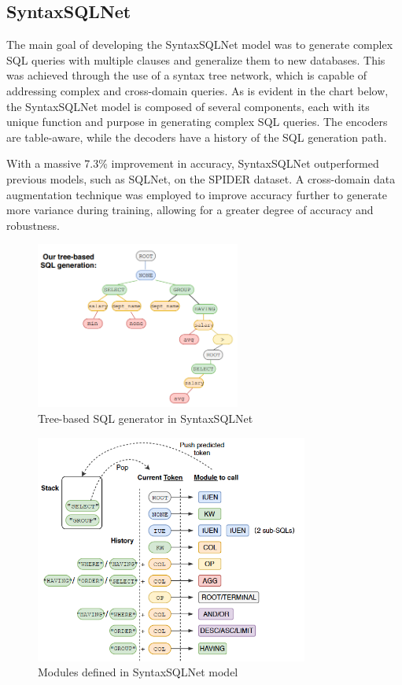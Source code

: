 \subsection{SyntaxSQLNet}

The main\cite{DBLP:journals/corr/abs-1810-05237} goal of developing the SyntaxSQLNet model was to generate complex SQL queries with multiple clauses and generalize them to new databases.
This was achieved through the use of a syntax tree network, which is capable of addressing complex and cross-domain queries.
As is evident in the chart below, the SyntaxSQLNet model is composed of several components, each with its unique function and purpose in generating complex SQL queries. The encoders are table-aware, while the decoders have a history of the SQL generation path.

With a massive 7.3\% improvement in accuracy, SyntaxSQLNet outperformed previous models, such as SQLNet, on the SPIDER dataset.
A cross-domain data augmentation technique was employed to improve accuracy further to generate more variance during training, allowing for a greater degree of accuracy and robustness.

\begin{figure}[htb]
    \centering
    \includegraphics[width=0.6\textwidth]{pics/SyntaxSQLNet/Tree-based.png}
    \caption{Tree-based SQL generator in SyntaxSQLNet\cite{DBLP:journals/corr/abs-1810-05237}}
    \label{fig:tree-based}
\end{figure}

\begin{figure}[htb]
    \centering
    \includegraphics[width=0.8\textwidth]{pics/SyntaxSQLNet/Grammar.png}
    \caption{Modules defined in SyntaxSQLNet model\cite{DBLP:journals/corr/abs-1810-05237}}
    \label{fig:grammar}
\end{figure}

